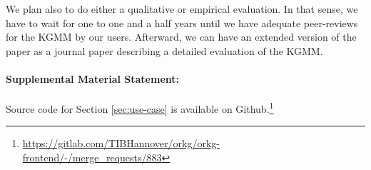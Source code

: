 \documentclass[runningheads]{llncs}
\begin{document}
We plan also to do either a qualitative or empirical evaluation. In that sense, we have to wait for one to one and a half years until we have adequate peer-reviews for the KGMM by our users. Afterward, we can have an extended version of the paper as a journal paper describing a detailed evaluation of the KGMM.
%
%
%
\paragraph*{Supplemental Material Statement:} Source code for Section \ref{sec:use-case} is available on Github.\footnote{\url{https://gitlab.com/TIBHannover/orkg/orkg-frontend/-/merge_requests/883}}


\end{document}
